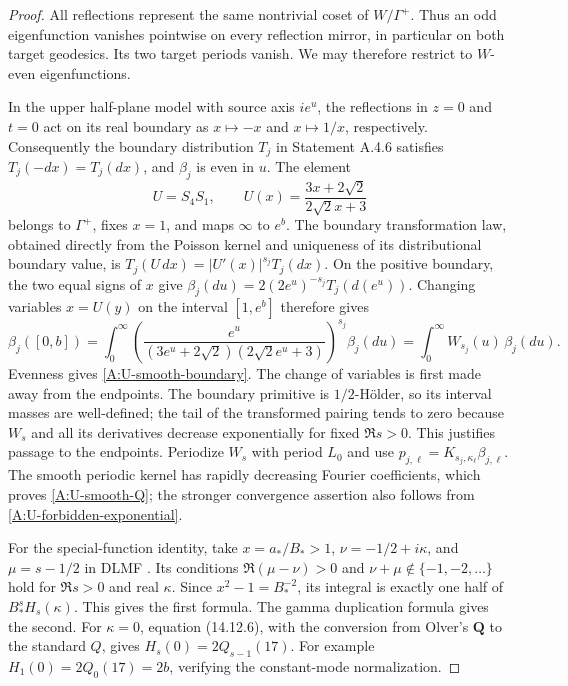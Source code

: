 \begin{proof}
All reflections represent the same nontrivial coset of
$W/\Gamma^+$. Thus an odd eigenfunction vanishes pointwise on every
reflection mirror, in particular on both target geodesics.
Its two target periods vanish. We may therefore restrict to
$W$-even eigenfunctions.

In the upper half-plane model with source axis $i e^u$, the reflections
in $z=0$ and $t=0$ act on its real boundary as $x\mapsto-x$ and
$x\mapsto1/x$, respectively. Consequently the boundary distribution
$T_j$ in Statement A.4.6 satisfies $T_j(-dx)=T_j(dx)$, and
$\beta_j$ is even in $u$. The element
\[
 U=S_4S_1,\qquad U(x)=\frac{3x+2\sqrt2}{2\sqrt2 x+3}
\]
belongs to $\Gamma^+$, fixes $x=1$, and maps $\infty$ to $e^b$.
The boundary transformation law, obtained directly from the Poisson
kernel and uniqueness of its distributional boundary value, is
$T_j(U\,dx)=|U'(x)|^{s_j}T_j(dx)$.
On the positive boundary, the two equal signs of $x$ give
$\beta_j(du)=2(2e^u)^{-s_j}T_j(d(e^u))$.
Changing variables $x=U(y)$ on the interval $[1,e^b]$ therefore gives
\[
 \beta_j([0,b])
 =\int_0^\infty
 \left(\frac{e^u}
 {(3e^u+2\sqrt2)(2\sqrt2e^u+3)}\right)^{s_j}
 \beta_j(du)
 =\int_0^\infty W_{s_j}(u)\,\beta_j(du).
\]
Evenness gives \eqref{A:U-smooth-boundary}. The change of variables
is first made away from the endpoints. The boundary primitive is
$1/2$-H\"older, so its interval masses are well-defined; the tail
of the transformed pairing tends to zero because $W_s$ and all its
derivatives decrease exponentially for fixed $\Re s>0$.
This justifies passage to the endpoints.
Periodize $W_s$ with period $L_0$ and use
$p_{j,\ell}=K_{s_j,\kappa_\ell}\beta_{j,\ell}$.
The smooth periodic kernel has rapidly decreasing Fourier coefficients,
which proves \eqref{A:U-smooth-Q}; the stronger convergence assertion
also follows from \eqref{A:U-forbidden-exponential}.

For the special-function identity, take
$x=a_*/B_*>1$, $\nu=-1/2+i\kappa$, and $\mu=s-1/2$
in DLMF \cite[equation (14.12.4)]{DLMF}. Its conditions
$\Re(\mu-\nu)>0$ and $\nu+\mu\notin\{-1,-2,\ldots\}$
hold for $\Re s>0$ and real $\kappa$.
Since $x^2-1=B_*^{-2}$, its integral is exactly one half
of $B_*^sH_s(\kappa)$. This gives the first formula.
The gamma duplication formula gives the second.
For $\kappa=0$, equation (14.12.6), with the conversion
from Olver's $\mathbf Q$ to the standard $Q$, gives
$H_s(0)=2Q_{s-1}(17)$. For example
$H_1(0)=2Q_0(17)=2b$, verifying the constant-mode normalization.


\end{proof}
